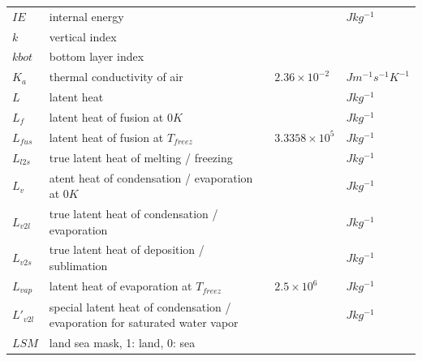 \documentclass[letterpaper,titlepage,10pt]{article}
\numberwithin{equation}{section}
\begin{document}
\begin{appendices}
\begin{longtable}{p{}p{}p{}p{}}
	$IE$               & internal energy                                                                      &                            & $J kg^{-1}$ \\
	$k$                & vertical index                                                                       &                            & \\
	$kbot$             & bottom layer index                                                                   &                            & \\
	$K_a$              & thermal conductivity of air                                                          & $2.36 \times 10^{-2}$      & $J m^{-1} s^{-1} K^{-1}$ \\
	$L$                & latent heat                                                                          &                            & $J kg^{-1}$ \\
	$L_f$              & latent heat of fusion at $0K$                                                        &                            & $J kg^{-1}$ \\
	$L_{fus}$          & latent heat of fusion at $T_{freez}$                                                 & $3.3358 \times 10^5$       & $J kg^{-1}$ \\
	$L_{l2s}$          & true latent heat of melting / freezing                                               &                            & $J kg^{-1}$ \\
	$L_v$              & atent heat of condensation / evaporation at $0K$                                     &                            & $J kg^{-1}$ \\
	$L_{v2l}$          & true latent heat of condensation / evaporation                                       &                            & $J kg^{-1}$ \\
	$L_{v2s}$          & true latent heat of deposition / sublimation                                         &                            & $J kg^{-1}$ \\
	$L_{vap}$          & latent heat of evaporation at $T_{freez}$                                            & $2.5 \times 10^6$          & $J kg^{-1}$ \\
	$L'_{v2l}$         & special latent heat of condensation / evaporation for saturated water vapor          &                            & $J kg^{-1}$ \\
	$LSM$              & land sea mask, 1: land, 0: sea                                                       &                            & \\

\end{longtable}
\end{appendices}
\end{document}
